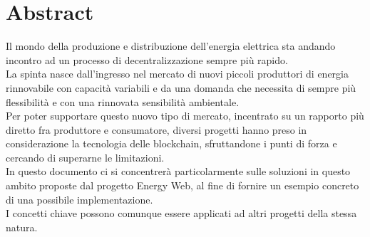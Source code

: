 \chapter*{Abstract}

Il mondo della produzione e distribuzione dell'energia elettrica sta andando incontro ad un processo di decentralizzazione sempre più rapido. \\
La spinta nasce dall'ingresso nel mercato di nuovi piccoli produttori di energia rinnovabile con capacità variabili e
da una domanda che necessita di sempre più flessibilità e con una rinnovata sensibilità ambientale. \\
Per poter supportare questo nuovo tipo di mercato, incentrato su un rapporto più diretto fra produttore e consumatore,
diversi progetti hanno preso in considerazione la tecnologia delle blockchain, sfruttandone i punti di forza e cercando di superarne le limitazioni. \\
In questo documento ci si concentrerà particolarmente sulle soluzioni in questo ambito proposte dal progetto Energy Web,
al fine di fornire un esempio concreto di una possibile implementazione. \\
I concetti chiave possono comunque essere applicati ad altri progetti della stessa natura.